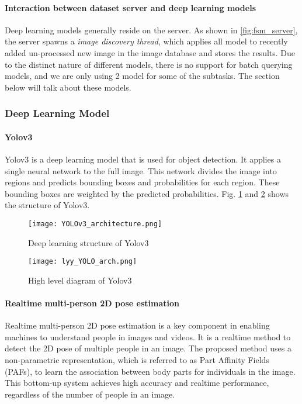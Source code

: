 \paragraph{Interaction between dataset server and deep learning models} Deep
learning models generally reside on the server. As shown in
\ref{fig:fsm_server}, the server spawns a \textit{image discovery thread},
which applies all model to recently added un-processed new image in the image
database and stores the results. Due to the distinct nature of different
models, there is no support for batch querying models, and we are only using 2
model for some of the subtasks. The section below will talk about these models.

\subsubsection{Deep Learning Model}

\paragraph{Yolov3} Yolov3 is a deep learning model that is used for object
detection. It applies a single neural network to the full image. This network
divides the image into regions and predicts bounding boxes and probabilities
for each region. These bounding boxes are weighted by the predicted
probabilities. Fig. \ref{fig:yolov3} and \ref{fig:yolov3_arch} shows the
structure of Yolov3.

    \begin{figure}[h!]
        \centering \texttt{[image: YOLOv3\_architecture.png]}
        \caption{Deep learning structure of Yolov3}
        \label{fig:yolov3}
    \end{figure}


    \begin{figure}[h!]
        \centering \texttt{[image: lyy\_YOLO\_arch.png]}
        \caption{High level diagram of Yolov3}
        \label{fig:yolov3_arch}
    \end{figure}

\paragraph{Realtime multi-person 2D pose estimation} Realtime multi-person 2D
pose estimation is a key component in enabling machines to understand people in
images and videos. It is a realtime method to detect the 2D pose of multiple
people in an image. The proposed method uses a non-parametric representation,
which is referred to as Part Affinity Fields (PAFs), to learn the association
between body parts for individuals in the image. This bottom-up system achieves
high accuracy and realtime performance, regardless of the number of people in
an image. \cite{zhu2013pedestrian}

